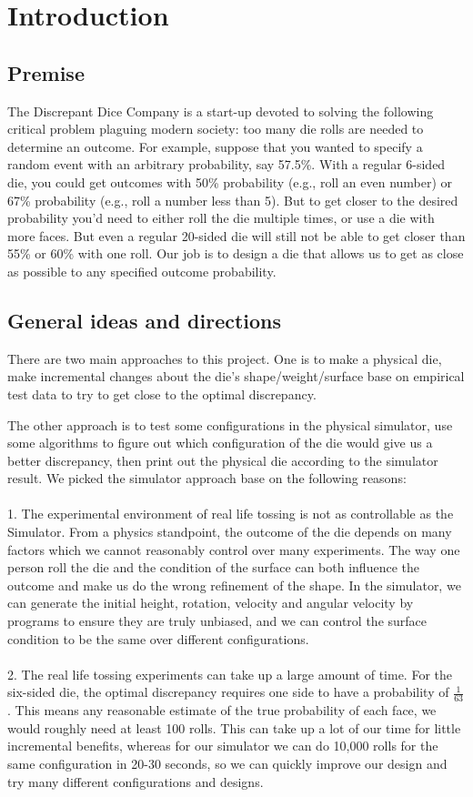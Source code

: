 \section{Introduction}
\subsection{Premise}
The Discrepant Dice Company is a start-up devoted to solving the following critical problem plaguing modern society: too many die rolls are needed to determine an outcome. For example, suppose that you wanted to specify a random event with an arbitrary probability, say 57.5\%. With a regular 6-sided die, you could get outcomes with 50\% probability (e.g., roll an even number) or 67\% probability (e.g., roll a number less than 5). But to get closer to the desired probability you'd need to either roll the die multiple times, or use a die with more faces. But even a regular 20-sided die will still not be able to get closer than 55\% or 60\% with one roll. Our job is to design a die that allows us to get as close as possible to any specified outcome probability.

\subsection{General ideas and directions}
There are two main approaches to this project. One is to make a physical die, make incremental changes about the die's shape/weight/surface base on empirical test data to try to get close to the optimal discrepancy.

The other approach is to test some configurations in the physical simulator, use some algorithms to figure out which configuration of the die would give us a better discrepancy, then print out the physical die according to the simulator result. 
We picked the simulator approach base on the following reasons:\\\\
1. The experimental environment of real life tossing is not as controllable as the Simulator. From a physics standpoint, the outcome of the die depends on many factors which we cannot reasonably control over many experiments. The way one person roll the die and the condition of the surface can both influence the outcome and make us do the wrong refinement of the shape. In the simulator, we can generate the initial height, rotation, velocity and angular velocity by programs to ensure they are truly unbiased, and we can control the surface condition to be the same over different configurations.\\\\
2. The real life tossing experiments can take up a large amount of time. For the six-sided die, the optimal discrepancy requires one side to have a probability of ${\frac{1}{63}}$. This means any reasonable estimate of the true probability of each face, we would roughly need at least 100 rolls. This can take up a lot of our time for little incremental benefits, whereas for our simulator we can do 10,000 rolls for the same configuration in 20-30 seconds, so we can quickly improve our design and try many different configurations and designs.\\
